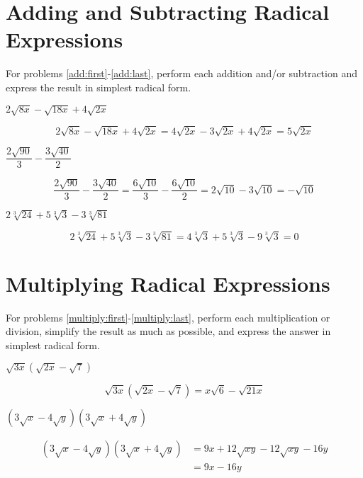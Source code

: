 \documentclass[fleqn,addpoints]{exam}
\begin{document}
\begin{questions}
\section{Adding and Subtracting Radical Expressions}

For problems \ref{add:first}-\ref{add:last}, perform each addition and/or subtraction and express the result in simplest
radical form.

\question[5] \( 2\sqrt{8x} - \sqrt{18x} + 4\sqrt{2x} \)
\label{add:first}
\begin{solution}[5 cm]
\[
  2\sqrt{8x} - \sqrt{18x} + 4\sqrt{2x}
  = 4 \sqrt{2x} - 3\sqrt{2x} + 4\sqrt{2x}
  = 5 \sqrt{2x}
\]
\end{solution}

\question[5] \( \dfrac{2 \sqrt{90}}{3} - \dfrac{3 \sqrt{40}}{2} \)
\begin{solution}[5 cm]
\[
  \frac{2 \sqrt{90}}{3} - \frac{3 \sqrt{40}}{2} 
  = \frac{6 \sqrt{10}}{3} - \frac{6 \sqrt{10}}{2} 
  = 2 \sqrt{10} - 3 \sqrt{10}
  = - \sqrt{10}
\]
\end{solution}

\question[5] \( 2 \sqrt[3]{24} + 5 \sqrt[3]{3} - 3\sqrt[3]{81} \)
\label{add:last}
\begin{solution}[5 cm]
\[
  2 \sqrt[3]{24} + 5 \sqrt[3]{3} - 3\sqrt[3]{81}
  = 4\sqrt[3]{3} + 5\sqrt[3]{3} - 9 \sqrt[3]{3}
  = 0
\]
\end{solution}



\section{Multiplying Radical Expressions}

For problems \ref{multiply:first}-\ref{multiply:last}, perform each multiplication or division, simplify the result as
much as possible, and express the answer in simplest radical form.

\question[3] \( \sqrt{3x} ( \sqrt{2x} - \sqrt{7}) \)
\label{multiply:first}
\begin{solution}[5 cm]
\[
  \sqrt{3x} ( \sqrt{2x} - \sqrt{7}) = x\sqrt{6} - \sqrt{21x}
\]
\end{solution}

\question[7] \( (3\sqrt{x} - 4 \sqrt{y})(3 \sqrt{x} + 4\sqrt{y}) \)
\begin{solution}[5 cm]
\begin{align*}
  (3\sqrt{x} - 4 \sqrt{y})(3 \sqrt{x} + 4\sqrt{y}) &= 9x + 12\sqrt{xy} - 12\sqrt{xy} - 16 y \\
  &= 9x-16y
\end{align*}



\end{solution}
\end{questions}
\end{document}
